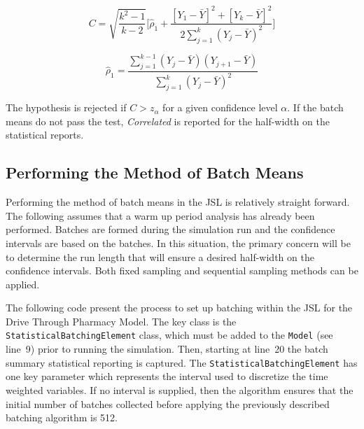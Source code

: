 \documentclass[
]{book}
\theoremstyle{definition}
\theoremstyle{definition}
\theoremstyle{definition}
\theoremstyle{definition}
\theoremstyle{remark}
\begin{document}
\[C = \sqrt{\dfrac{k^2 - 1}{k - 2}}\biggl[ \hat{\rho}_1 + \dfrac{[Y_1 - \bar{Y}]^2 + [Y_k - \bar{Y}]^2}{2 \sum_{j=1}^k (Y_j - \bar{Y})^2}\biggr]\]

\[\hat{\rho}_1 = \dfrac{\sum_{j=1}^{k-1} (Y_j - \bar{Y})(Y_{j+1} - \bar{Y})}{\sum _{j=1}^k (Y_j - \bar{Y})^2}\]

The hypothesis is rejected if \(C > z_\alpha\) for a given confidence
level \(\alpha\). If the batch means do not pass the test, \emph{Correlated} is
reported for the half-width on the statistical reports.

\hypertarget{simoa:infhorizon:jslbatching}{%
\subsection{Performing the Method of Batch Means}\label{simoa:infhorizon:jslbatching}}

Performing the method of batch means in the JSL is relatively straight
forward. The following assumes that a warm up period analysis has
already been performed. Batches are formed during the simulation run and
the confidence intervals are based on the batches. In this situation,
the primary concern will be to determine the run length that will ensure
a desired half-width on the confidence intervals. Both fixed sampling
and sequential sampling methods can be applied.

The following code present the process to set up batching
within the JSL for the Drive Through Pharmacy Model. The key class is
the \texttt{StatisticalBatchingElement} class, which must be added to the \texttt{Model}
(see line~9) prior to running the simulation. Then, starting at line~20
the batch summary statistical reporting is captured. The
\texttt{StatisticalBatchingElement} has one key parameter which represents the
interval used to discretize the time weighted variables. If no interval
is supplied, then the algorithm ensures that the initial number of
batches collected before applying the previously described batching
algorithm is 512.
\end{document}
